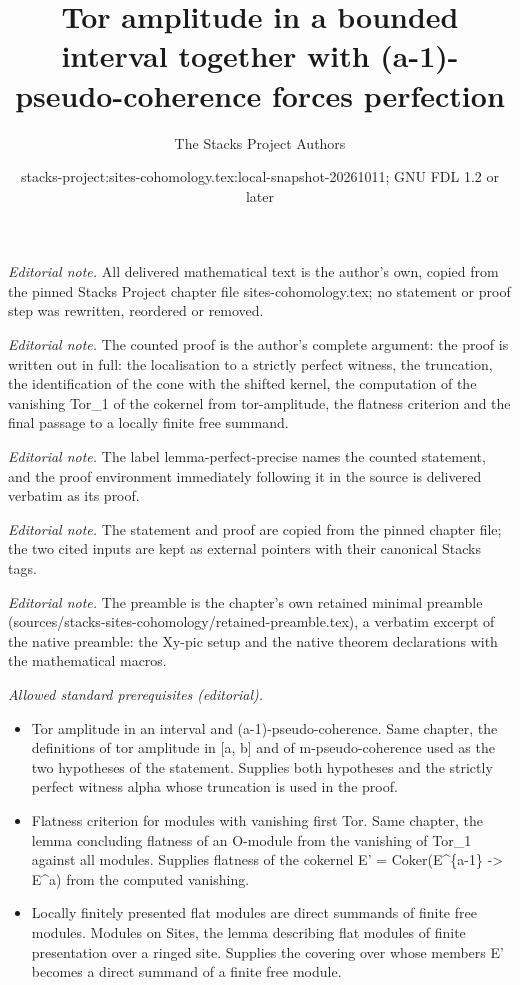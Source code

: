 \documentclass[10pt,a4paper]{amsart}
\title{Tor amplitude in a bounded interval together with (a-1)-pseudo-coherence forces perfection}
\author{The Stacks Project Authors}
\date{stacks-project:sites-cohomology.tex:local-snapshot-20261011; GNU FDL 1.2 or later}
\theoremstyle{plain}
\theoremstyle{definition}
\theoremstyle{remark}
\numberwithin{equation}{subsection}
\begin{document}
\maketitle
\noindent\textit{Editorial note.} All delivered mathematical text is the author's own, copied from the pinned Stacks Project chapter file sites-cohomology.tex; no statement or proof step was rewritten, reordered or removed.\par\medskip
\noindent\textit{Editorial note.} The counted proof is the author's complete argument: the proof is written out in full: the localisation to a strictly perfect witness, the truncation, the identification of the cone with the shifted kernel, the computation of the vanishing Tor\_1 of the cokernel from tor-amplitude, the flatness criterion and the final passage to a locally finite free summand.\par\medskip
\noindent\textit{Editorial note.} The label lemma-perfect-precise names the counted statement, and the proof environment immediately following it in the source is delivered verbatim as its proof.\par\medskip
\noindent\textit{Editorial note.} The statement and proof are copied from the pinned chapter file; the two cited inputs are kept as external pointers with their canonical Stacks tags.\par\medskip
\noindent\textit{Editorial note.} The preamble is the chapter's own retained minimal preamble (sources/stacks-sites-cohomology/retained-preamble.tex), a verbatim excerpt of the native preamble: the Xy-pic setup and the native theorem declarations with the mathematical macros.\par\medskip
\noindent\textit{Allowed standard prerequisites (editorial).}\begin{itemize}
\item Tor amplitude in an interval and (a-1)-pseudo-coherence. Same chapter, the definitions of tor amplitude in [a, b] and of m-pseudo-coherence used as the two hypotheses of the statement. Supplies both hypotheses and the strictly perfect witness alpha whose truncation is used in the proof.
\item Flatness criterion for modules with vanishing first Tor. Same chapter, the lemma concluding flatness of an O-module from the vanishing of Tor\_1 against all modules. Supplies flatness of the cokernel E' = Coker(E\textasciicircum{}\{a-1\} -> E\textasciicircum{}a) from the computed vanishing.
\item Locally finitely presented flat modules are direct summands of finite free modules. Modules on Sites, the lemma describing flat modules of finite presentation over a ringed site. Supplies the covering over whose members E' becomes a direct summand of a finite free module.
\end{itemize}\medskip
\end{document}
